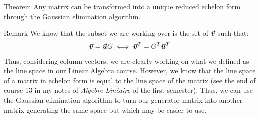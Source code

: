 \documentclass[a4paper]{article}
\begin{document}
\begin{parag}{Theorem}
    Any matrix can be transformed into a unique reduced echelon form through the Gaussian elimination algorithm.
\end{parag}

\begin{parag}{Remark}
    We know that the subset we are working over is the set of $\bm{\protect\vec{v}}$ such that:
    \[\bm{\protect\vec{v}} = \bm{\protect\vec{u}} G \iff \bm{\protect\vec{v}}^T = G^T \bm{\protect\vec{u}}^T\]

    Thus, considering column vectors, we are clearly working on what we defined as the line space in our Linear Algebra course. However, we know that the line space of a matrix in echelon form is equal to the line space of the matrix (see the end of course 13 in my notes of \textit{Algèbre Linéaire} of the first semester). Thus, we can use the Gaussian elimination algorithm to turn our generator matrix into another matrix generating the same space but which may be easier to use.
\end{parag}
\end{document}
